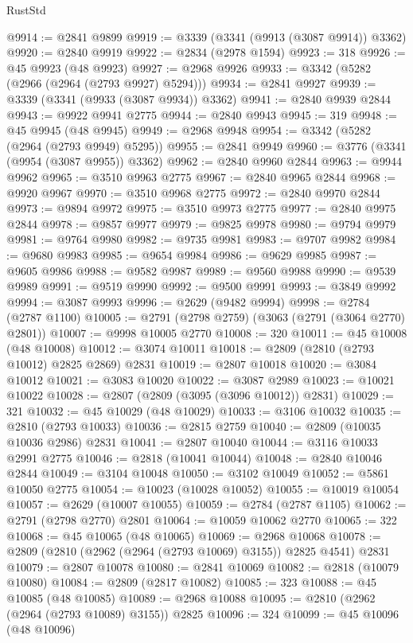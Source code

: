 \begin{lexlean}{RustStd}
\begin{coremodule}
@9914 := @2841 @9899
@9919 := @3339 (@3341 (@9913 (@3087 @9914)) @3362)
@9920 := @2840 @9919
@9922 := @2834 (@2978 @1594)
@9923 := 318
@9926 := @45 @9923 (@48 @9923)
@9927 := @2968 @9926
@9933 := @3342 (@5282 (@2966 (@2964 (@2793 @9927) @5294)))
@9934 := @2841 @9927
@9939 := @3339 (@3341 (@9933 (@3087 @9934)) @3362)
@9941 := @2840 @9939 @2844
@9943 := @9922 @9941 @2775
@9944 := @2840 @9943
@9945 := 319
@9948 := @45 @9945 (@48 @9945)
@9949 := @2968 @9948
@9954 := @3342 (@5282 (@2964 (@2793 @9949) @5295))
@9955 := @2841 @9949
@9960 := @3776 (@3341 (@9954 (@3087 @9955)) @3362)
@9962 := @2840 @9960 @2844
@9963 := @9944 @9962
@9965 := @3510 @9963 @2775
@9967 := @2840 @9965 @2844
@9968 := @9920 @9967
@9970 := @3510 @9968 @2775
@9972 := @2840 @9970 @2844
@9973 := @9894 @9972
@9975 := @3510 @9973 @2775
@9977 := @2840 @9975 @2844
@9978 := @9857 @9977
@9979 := @9825 @9978
@9980 := @9794 @9979
@9981 := @9764 @9980
@9982 := @9735 @9981
@9983 := @9707 @9982
@9984 := @9680 @9983
@9985 := @9654 @9984
@9986 := @9629 @9985
@9987 := @9605 @9986
@9988 := @9582 @9987
@9989 := @9560 @9988
@9990 := @9539 @9989
@9991 := @9519 @9990
@9992 := @9500 @9991
@9993 := @3849 @9992
@9994 := @3087 @9993
@9996 := @2629 (@9482 @9994)
@9998 := @2784 (@2787 @1100)
@10005 := @2791 (@2798 @2759) (@3063 (@2791 (@3064 @2770) @2801))
@10007 := @9998 @10005 @2770
@10008 := 320
@10011 := @45 @10008 (@48 @10008)
@10012 := @3074 @10011
@10018 := @2809 (@2810 (@2793 @10012) @2825 @2869) @2831
@10019 := @2807 @10018
@10020 := @3084 @10012
@10021 := @3083 @10020
@10022 := @3087 @2989
@10023 := @10021 @10022
@10028 := @2807 (@2809 (@3095 (@3096 @10012)) @2831)
@10029 := 321
@10032 := @45 @10029 (@48 @10029)
@10033 := @3106 @10032
@10035 := @2810 (@2793 @10033)
@10036 := @2815 @2759
@10040 := @2809 (@10035 @10036 @2986) @2831
@10041 := @2807 @10040
@10044 := @3116 @10033 @2991 @2775
@10046 := @2818 (@10041 @10044)
@10048 := @2840 @10046 @2844
@10049 := @3104 @10048
@10050 := @3102 @10049
@10052 := @5861 @10050 @2775
@10054 := @10023 (@10028 @10052)
@10055 := @10019 @10054
@10057 := @2629 (@10007 @10055)
@10059 := @2784 (@2787 @1105)
@10062 := @2791 (@2798 @2770) @2801
@10064 := @10059 @10062 @2770
@10065 := 322
@10068 := @45 @10065 (@48 @10065)
@10069 := @2968 @10068
@10078 := @2809 (@2810 (@2962 (@2964 (@2793 @10069) @3155)) @2825 @4541) @2831
@10079 := @2807 @10078
@10080 := @2841 @10069
@10082 := @2818 (@10079 @10080)
@10084 := @2809 (@2817 @10082)
@10085 := 323
@10088 := @45 @10085 (@48 @10085)
@10089 := @2968 @10088
@10095 := @2810 (@2962 (@2964 (@2793 @10089) @3155)) @2825
@10096 := 324
@10099 := @45 @10096 (@48 @10096)

\end{coremodule}
\end{lexlean}

